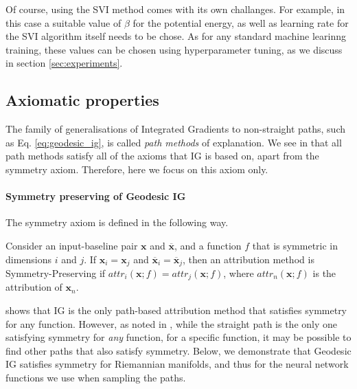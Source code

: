 Of course, using the SVI method comes with its own challanges. For example, in this case a suitable value of $\beta$ for the potential energy, as well as learning rate for the SVI algorithm itself needs to be chose. As for any standard machine learinng training, these values can be chosen using hyperparameter tuning, as we discuss in section \ref{sec:experiments}.

\subsection{Axiomatic properties}
The family of generalisations of Integrated Gradients to non-straight paths, such as Eq. \ref{eq:geodesic_ig}, is called \emph{path methods} of explanation. We see in \citet{sundararajan2017axiomatic} that all path methods satisfy all of the axioms that IG is based on, apart from the symmetry axiom. Therefore, here we focus on this axiom only.

\paragraph{Symmetry preserving of Geodesic IG}

The symmetry axiom is defined in the following way. 
\begin{definition}
	Consider an input-baseline pair $\textbf{x}$ and $\overline{\textbf{x}}$, and a function $f$ that is symmetric in dimensions $i$ and $j$. If $\textbf{x}_i = \textbf{x}_j$ and $\overline{\textbf{x}}_i = \overline{\textbf{x}}_j$, then an attribution method is Symmetry-Preserving if $attr_i(\textbf{x}; f) = attr_j(\textbf{x}; f)$, where $attr_n(\textbf{x}; f)$ is the attribution of $\textbf{x}_n$.
\end{definition}

\citep[Theorem 1]{sundararajan2017axiomatic} shows that IG is the only path-based attribution method that satisfies symmetry for any function. However, as noted in \cite{kapishnikov2021guided}, while the straight path is the only one satisfying symmetry for \emph{any} function, for a specific function, it may be possible to find other paths that also satisfy symmetry. Below, we demonstrate that Geodesic IG satisfies symmetry for Riemannian manifolds, and thus for the neural network functions we use when sampling the paths.

